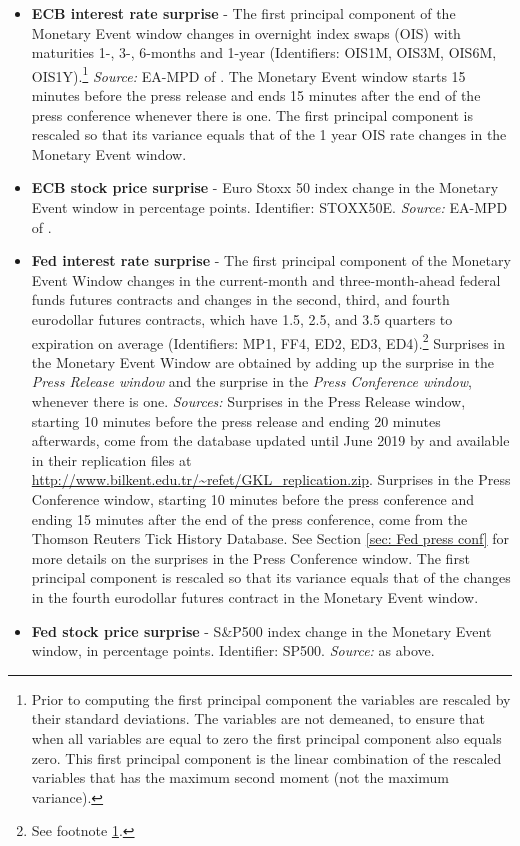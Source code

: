 \documentclass[a4paper,12pt]{article}
\begin{document}
\begin{itemize}
\item
\textbf{ECB interest rate surprise} - The first principal component of the Monetary Event window changes
in overnight index swaps (OIS) with maturities 1-, 3-, 6-months and 1-year (Identifiers: OIS1M, OIS3M, OIS6M, OIS1Y).\footnote{\label{footnote:pc}Prior to computing the first principal component the variables are rescaled by their standard deviations. The variables are not demeaned, to ensure
that when all variables are equal to zero the first principal component also equals zero. 
This first principal component is the linear combination of the rescaled variables that has
the maximum second moment (not the maximum variance).}
\emph{Source:} EA-MPD of \cite{Altavilla_etal_2019}. The Monetary Event window starts 15 minutes
before the press release and ends 15 minutes after the end of the press conference whenever there is one. 
The first principal component is rescaled so that its variance equals that of
the 1 year OIS rate changes in the Monetary Event window.
\item
\textbf{ECB stock price surprise} - 
Euro Stoxx 50 index change in the Monetary Event window in percentage points. Identifier: STOXX50E. \emph{Source:} EA-MPD of \cite{Altavilla_etal_2019}.
\item
\textbf{Fed interest rate surprise} - 
The first principal component of the Monetary Event Window changes in 
the current-month and three-month-ahead federal
funds futures contracts and changes in the second, third, and fourth eurodollar futures contracts,
which have 1.5, 2.5, and 3.5 quarters to expiration on average (Identifiers: MP1, FF4, ED2, ED3, ED4).\footnote{See footnote \ref{footnote:pc}.} Surprises in the Monetary Event Window are obtained by adding up the surprise in the \emph{Press Release window} and the surprise in the \emph{Press Conference window}, whenever there is one. \emph{Sources:} Surprises in the Press Release window, starting 10 minutes before the press release and ending 20 minutes afterwards, come from the \cite{Gurkaynak_Sack_Swanson_2005a} database updated until June 2019 by \cite{Gurkaynak_Karasoy_Lee_2022} and available in their replication files at \url{http://www.bilkent.edu.tr/~refet/GKL_replication.zip}. Surprises in the Press Conference window, starting 10 minutes before the press conference and ending 15 minutes after the end of the press conference, come from the Thomson Reuters Tick History Database. See Section \ref{sec: Fed press conf} for more details on the surprises in the Press Conference window.
The first principal component is rescaled so that its variance equals that of
the changes in the fourth eurodollar futures contract in the Monetary Event window.
\item
\textbf{Fed stock price surprise} - 
S\&P500 index change in the Monetary Event window, in percentage points. Identifier: SP500. \emph{Source:} as above.
\end{itemize}
\end{document}

